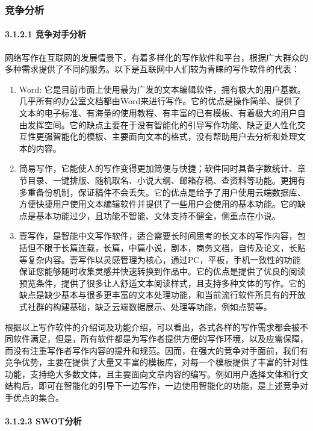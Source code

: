 \documentclass[10pt,letterpaper]{article}
\begin{document}
\subsubsection{竞争分析}
\paragraph{3.1.2.1 竞争对手分析}
\rule{0pt}{0pt} 

网络写作在互联网的发展情景下，有着多样化的写作软件和平台，根据广大群众的多种需求提供了不同的服务。以下是互联网中人们较为青睐的写作软件的代表：

\begin{enumerate}
\item 	Word: 它是目前市面上使用最为广发的文本编辑软件，拥有极大的用户基数。几乎所有的办公室文档都由Word来进行写作。它的优点是操作简单、提供了文本的电子标准、有海量的使用教程、有丰富的已有模板、有着极大的用户自由发挥空间。它的缺点主要在于没有智能化的引导写作功能、缺乏更人性化交互性更强智能化的模板、主要面向文本的格式，没有帮助用户去分析和处理文本的内容。
\item 	简易写作，它能使人的写作变得更加简便与快捷；软件同时具备字数统计、章节目录、一键排版、随机取名、小说大纲、邮箱存稿、查资料等功能。更拥有多重备份机制，保证稿件不会丢失。它的优点是给予了用户使用云端数据库、方便快捷用户使用文本编辑软件并提供了一些用户会使用的基本功能。它的缺点是基本功能过少，且功能不智能、文体支持不健全，侧重点在小说。
\item 	壹写作，是智能中文写作软件，适合需要长时间思考的长文本的写作内容，包括但不限于长篇连载，长篇，中篇小说，剧本，商务文档，自传及论文，长贴等复杂内容。壹写作以灵感管理为核心，通过PC，平板，手机一致性的功能保证您能够随时收集灵感并快速转换到作品中。它的优点是提供了优良的阅读预览条件，提供了很多让人舒适文本阅读样式，且支持多种文体的写作。它的缺点是缺少基本与很多更丰富的文本处理功能，和当前流行软件所具有的开放式社群的构建基础，缺乏云端数据展示、处理等功能，例如点赞等。
\end{enumerate}

根据以上写作软件的介绍词及功能介绍，可以看出，各式各样的写作需求都会被不同软件满足，但是，所有软件都是为写作者提供方便的写作环境，以及应需保障，而没有注重写作者写作内容的提升和规范。因而，在强大的竞争对手面前，我们有竞争优势，主要在提供了大量又丰富的模板库，对每一个模板提供了丰富的针对性功能，支持绝大多数文体，且主要面向文章内容的编写。例如用户选择文体和行文结构后，即可在智能化的引导下一边写作，一边使用智能化的功能，是上述竞争对手优点的集合。

\paragraph{3.1.2.3 SWOT分析}
\rule{0pt}{0pt} 
\end{document}
